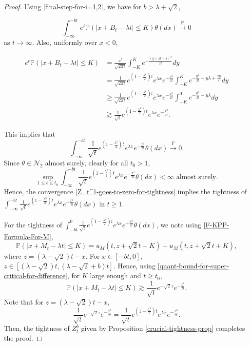 \documentclass[a4paper,reqno]{amsart}%
\newcommand{\1}{\mathbf 1}
\theoremstyle{mine}
\numberwithin{theorem}{section}
\numberwithin{equation}{section}
\theoremstyle{remark}
\begin{document}
\begin{proof}
Using \eqref{final-step-for-i=1,2}, we have for $b>\lambda + \sqrt{2}$, 

\[ \int_{-\infty}^{-bt} e^t \mathbb{P}(|x + B_t - \lambda t| \leq K)\theta(dx)\overset{\mathbb{P}}{\to} 0\]
as $t\to \infty$. Also, uniformly over $x<0$,

\begin{align} \label{Brownian-in-negative-part-actually-gives-sharp-bound-super-critical}
    e^t \mathbb{P}(|x + B_t - \lambda t| \leq K) &= \frac{e^t}{\sqrt{2\pi t}} \int_{-K}^K e^{-\frac{(y + \lambda t -x)^2}{2t}}dy \\ 
     \nonumber &=  \frac{1}{\sqrt{2\pi t}}e^{(1-\frac{\lambda^2}{2})t}e^{\lambda x}e^{-\frac{x^2}{2t}} \int_{-K}^K e^{-\frac{y^2}{2t}-y\lambda + \frac{xy}{t}}dy \\ 
     \nonumber & \geq \frac{1}{\sqrt{2\pi t}}e^{(1-\frac{\lambda^2}{2})t}e^{\lambda x}e^{-\frac{x^2}{2t}} \int_{-K}^0 e^{-\frac{y^2}{2t}-y\lambda}dy \\
    \nonumber&\gtrsim  \frac{1}{\sqrt{t}}e^{(1-\frac{\lambda^2}{2})t}e^{\lambda x}e^{-\frac{x^2}{2t}}.
\end{align}

This implies that 
\begin{equation}\label{Z_t^1-goes-to-zero-for-tightness}
    \int_{-\infty}^{-bt} \frac{1}{\sqrt{t}}e^{(1-\frac{\lambda^2}{2})t}e^{\lambda x}e^{-\frac{x^2}{2t}} \theta(dx)\overset{\mathbb{P}}{\to} 0.
\end{equation}
Since $\theta \in \mathcal{N}_2$ almost surely, clearly for all $t_0 >1$, 
\[ \sup_{1\leq t \leq t_0} \int_{-\infty}^{-bt} \frac{1}{\sqrt{t}}e^{(1-\frac{\lambda^2}{2})t}e^{\lambda x}e^{-\frac{x^2}{2t}} \theta(dx) <\infty \textrm{ almost surely.} \]
Hence, the convergence \eqref{Z_t^1-goes-to-zero-for-tightness} implies the tightness of $\int_{-\infty}^{-bt} \frac{1}{\sqrt{t}}e^{(1-\frac{\lambda^2}{2})t}e^{\lambda x}e^{-\frac{x^2}{2t}} \theta(dx)$ in $t\geq 1$. 


For the tightness of $\int_{-bt}^{0} \frac{1}{\sqrt{t}}e^{(1-\frac{\lambda^2}{2})t}e^{\lambda x}e^{-\frac{x^2}{2t}} \theta(dx)$, we note using \eqref{F-KPP-Formula-For-M}, 
\[ \mathbb{P}(|x + M_t -\lambda t| \leq K) = u_M(t, z + \sqrt{2}t - K) -u_M(t, z + \sqrt{2}t + K), \]
where $z = (\lambda - \sqrt{2})t - x$. For $x \in [-  bt, 0]$, $z \in [(\lambda -\sqrt{2})t, (\lambda -\sqrt{2} + b) t]$. Hence, using \eqref{quant-bound-for-super-critical-for-difference}, for $K$ large enough and $t\geq t_0$,  
\begin{equation} \label{replace-M-bound-by-its-lower-explicit-integral}
    \mathbb{P}(|x + M_t -\lambda t| \leq K) \gtrsim  \frac{1}{\sqrt{t}} e^{-\sqrt{2}z} e^{-\frac{z^2}{2t}}.
\end{equation}
Note that for $z = (\lambda - \sqrt{2})t - x$, 
\begin{equation}\label{z-to-x-transformation}
        \frac{1}{\sqrt{t}} e^{-\sqrt{2}z} e^{-\frac{z^2}{2t}} = \frac{1}{\sqrt{t}}e^{(1-\frac{\lambda^2}{2})t}e^{\lambda x}e^{-\frac{x^2}{2t}}.
    \end{equation}
Then, the tightness of $Z_t^b$ given by Proposition \ref{crucial-tightness-prop} completes the proof. 


\end{proof}
\end{document}
